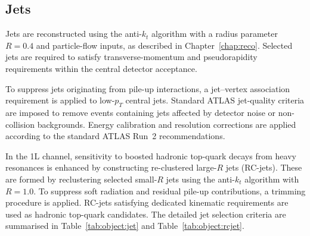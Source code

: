 

\subsection{Jets}
\label{subsec:obj-jets}

Jets are reconstructed using the anti-$k_t$ algorithm with a
radius parameter $R=0.4$ and particle-flow inputs, as described
in Chapter~\ref{chap:reco}. Selected jets are required to satisfy
transverse-momentum and pseudorapidity requirements within the
central detector acceptance.

To suppress jets originating from pile-up interactions, a jet–vertex
association requirement is applied to low-$p_T$ central jets.
Standard ATLAS jet-quality criteria are imposed to remove events
containing jets affected by detector noise or non-collision
backgrounds. Energy calibration and resolution corrections are
applied according to the standard ATLAS Run~2 recommendations.

In the 1L channel, sensitivity to boosted hadronic top-quark
decays from heavy resonances is enhanced by constructing
re-clustered large-$R$ jets (RC-jets).
These are formed by reclustering selected small-$R$ jets using the
anti-$k_t$ algorithm with $R=1.0$.
To suppress soft radiation and residual pile-up contributions,
a trimming procedure is applied.
RC-jets satisfying dedicated kinematic requirements are used as
hadronic top-quark candidates.
The detailed jet selection criteria are summarised in
Table~\ref{tab:object:jet} and Table~\ref{tab:object:rcjet}.

